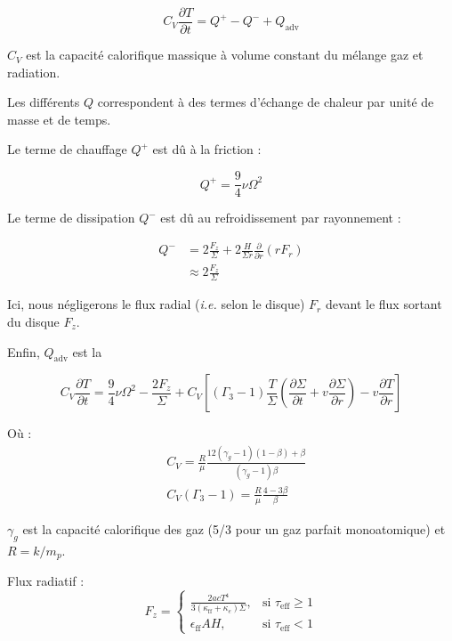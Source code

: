 \begin{equation}
    \label{eq:equation_thermique}
    C_V \frac{\partial T}{\partial t} = Q^+ - Q^- + Q_\mathrm{adv}
\end{equation}

$C_V$ est la capacité calorifique massique à volume constant du mélange gaz et
radiation.

Les différents $Q$ correspondent à des termes d’échange de chaleur par unité de
masse et de temps.

Le terme de chauffage $Q^+$ est dû à la friction :

\begin{equation}
    \label{eq:chauffage}
    Q^+ = \frac{9}{4} \nu \Omega^2
\end{equation}

Le terme de dissipation $Q^-$ est dû au refroidissement par rayonnement :

\begin{align}
    Q^- &= 2 \frac{F_z}{\Sigma} + 2 \frac{H}{\Sigma r} \frac{\partial}{\partial r} \left(r F_r\right) \\
    \label{eq:refroidissement}
        &\approx 2 \frac{F_z}{\Sigma}
\end{align}

Ici, nous négligerons le flux radial (\textit{i.e.} selon le disque) $F_r$
devant le flux sortant du disque $F_z$.

Enfin, $Q_\mathrm{adv}$ est la 

\begin{equation}
    C_V \frac{\partial T}{\partial t} = \frac{9}{4} \nu \Omega^2 - \frac{2 F_z}{\Sigma} + C_V \left[ (\Gamma_3 - 1) \frac{T}{\Sigma} \left( \frac{\partial \Sigma}{\partial t} + v \frac{\partial \Sigma}{\partial r}  \right) - v \frac{\partial T}{\partial r} \right]
\end{equation}

Où :
\begin{align}
    &C_V = \frac{R}{\mu} \frac{12 (\gamma_g - 1)(1 - \beta) + \beta}{(\gamma_g - 1) \beta} \\
    &C_V (\Gamma_3 - 1) = \frac{R}{\mu} \frac{4 - 3\beta}{\beta}
\end{align}

$\gamma_g$ est la capacité calorifique des gaz (\num{5/3} pour un gaz parfait monoatomique) et $R = k / m_p$.

Flux radiatif :
\begin{equation}
    F_z =
    \begin{cases}
        \frac{2 a c T^4}{3 (\kappa_\mathrm{ff} + \kappa_e)\Sigma}, &\text{si $\tau_\mathrm{eff} \geq 1$} \\
        \epsilon_\mathrm{ff} A H, &\text{si $\tau_\mathrm{eff} < 1$}
    \end{cases}
\end{equation}


